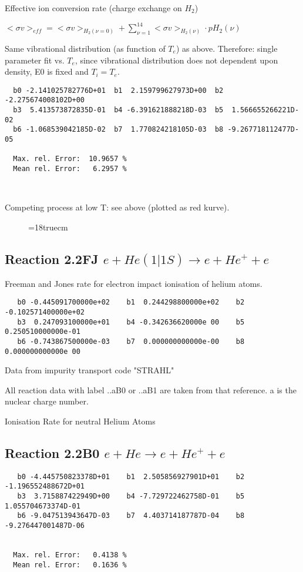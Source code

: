   Effective ion conversion rate (charge exchange on $H_2$)

  $ <\sigma v>_{eff} = <\sigma v>_{H_2(\nu=0)} + \sum_{\nu=1}^{14}
<\sigma v>_{H_2(\nu)} \cdot pH_2(\nu) $

  Same vibrational distribution (as function of $T_e$) as above.
  Therefore:
  single parameter fit vs. $T_e$,
  since vibrational distribution does not dependent upon density, E0 is fixed
  and
$T_i = T_e$.

\begin{verbatim}
  b0 -2.141025782776D+01  b1  2.159799627973D+00  b2 -2.275674008102D+00
  b3  5.413573872835D-01  b4 -6.391621888218D-03  b5  1.566655266221D-02
  b6 -1.068539042185D-02  b7  1.770824218105D-03  b8 -9.267718112477D-05

  Max. rel. Error:  10.9657 %
  Mean rel. Error:   6.2957 %



\end{verbatim}
Competing process at low T: see above (plotted as red kurve).
\begin{figure} \label{3.2.3}
\epsfxsize=18truecm
\end{figure}
\newpage


\subsection{
Reaction 2.2FJ  $e + He(1|1S) \rightarrow e + He^+ + e$
}
Freeman and Jones rate for electron impact ionisation of helium atoms.

\begin{verbatim}
   b0 -0.445091700000e+02    b1  0.244298800000e+02    b2 -0.102571400000e+02
   b3  0.247093100000e+01    b4 -0.342636620000e 00    b5  0.250510000000e-01
   b6 -0.743867500000e-03    b7  0.000000000000e-00    b8  0.000000000000e 00
\end{verbatim}

Data from impurity transport code "STRAHL" \cite{kn:Behringer}

All reaction data with label ..aB0 or ..aB1 are taken from that
reference. a is the nuclear charge number.

Ionisation Rate for neutral Helium Atoms



\subsection{
Reaction 2.2B0   $e + He \rightarrow e + He^+ + e $
}
\begin{verbatim}
   b0 -4.445750823378D+01    b1  2.505856927901D+01    b2 -1.196552488672D+01
   b3  3.715887422949D+00    b4 -7.729722462758D-01    b5  1.055704673374D-01
   b6 -9.047513943647D-03    b7  4.403714187787D-04    b8 -9.276447001487D-06


  Max. rel. Error:   0.4138 %
  Mean rel. Error:   0.1636 %
\end{verbatim}

